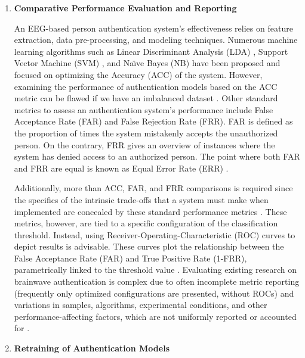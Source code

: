 \begin{enumerate}
\item \textbf{\large Comparative Performance Evaluation and Reporting}
\smallskip

An EEG-based person authentication system's effectiveness relies on feature extraction, data pre-processing, and modeling techniques. Numerous machine learning algorithms such as Linear Discriminant Analysis (LDA) \cite{seha2019new}, Support Vector Machine (SVM) \cite{SVM}, and Na\"{\i}ve Bayes (NB) \cite{naive_bayes} have been proposed and focused on optimizing the Accuracy (ACC) of the system. However, examining the performance of authentication models based on the ACC metric can be flawed if we have an imbalanced dataset \cite{sugrim_robust_metrics}. Other standard metrics to assess an authentication system's performance include False Acceptance Rate (FAR) and False Rejection Rate (FRR). FAR is defined as the proportion of times the system mistakenly accepts the unauthorized person.
On the contrary, FRR gives an overview of instances where the system has denied access to an authorized person. The point where both FAR and FRR are equal is known as Equal Error Rate (ERR) \cite{arias2021inexpensive}. 
\smallskip

Additionally, more than ACC, FAR, and FRR comparisons is required since the specifics of the intrinsic trade-offs that a system must make when implemented are concealed by these standard performance metrics \cite{sugrim_robust_metrics}. These metrics, however, are tied to a specific configuration of the classification threshold. Instead, using Receiver-Operating-Characteristic (ROC) curves to depict results is advisable. These curves plot the relationship between the False Acceptance Rate (FAR) and True Positive Rate (1-FRR), parametrically linked to the threshold value \cite{arias2021inexpensive}. Evaluating existing research on brainwave authentication is complex due to often incomplete metric reporting (frequently only optimized configurations are presented, without ROCs) and variations in samples, algorithms, experimental conditions, and other performance-affecting factors, which are not uniformly reported or accounted for \cite{arias2023performance}.

\item \textbf{\large Retraining of Authentication Models} 
\smallskip


\end{enumerate}
